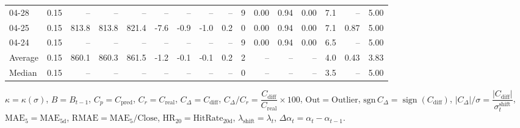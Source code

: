 \begin{threeparttable}
{\begin{tabular}{lrrrrrrrrrrrrrrr}
  04-28 &     0.15 &    -- &    -- &    -- &         -- &             -- &                       -- &                  -- &              9 &       0.00 &      0.94 &           0.00 &              7.1 &              -- &                   5.00 \\
  04-25 &     0.15 & 813.8 & 813.8 & 821.4 &       -7.6 &           -0.9 &                     -1.0 &                 0.2 &              0 &       0.00 &      0.94 &           0.00 &              7.1 &            0.87 &                   5.00 \\
  04-24 &     0.15 &    -- &    -- &    -- &         -- &             -- &                       -- &                  -- &              9 &       0.00 &      0.94 &           0.00 &              6.5 &              -- &                   5.00 \\
Average &     0.15 & 860.1 & 860.3 & 861.5 &       -1.2 &           -0.1 &                     -0.1 &                 0.2 &              2 &         -- &        -- &             -- &              4.0 &            0.43 &                   3.83 \\
 Median &     0.15 &    -- &    -- &    -- &         -- &             -- &                       -- &                  -- &              0 &         -- &        -- &             -- &              3.5 &              -- &                   5.00 \\
\bottomrule
\end{tabular}
}
\begin{tablenotes}\footnotesize
\item $\kappa=\kappa(\sigma)$, $B=B_{t-1}$, $C_p=C_{\text{pred}}$, $C_r=C_{\text{real}}$, $C_\Delta=C_{\text{diff}}$, $C_\Delta/C_r=\dfrac{C_{\text{diff}}}{C_{\text{real}}}\times100$, $\mathrm{Out}=\text{Outlier}$, $\mathrm{sgn}\,C_\Delta=\operatorname{sign}(C_{\text{diff}})$, $|C_\Delta|/\sigma=\dfrac{|C_{\text{diff}}|}{\sigma_t^{\text{shift}}}$, $\mathrm{MAE}_5=\mathrm{MAE}_{5\text{d}}$, $\mathrm{RMAE}= \mathrm{MAE}_5 / \text{Close}$, $\mathrm{HR}_{20}=\mathrm{HitRate}_{20\text{d}}$, 
$\lambda_{\text{shift}}=\lambda_t$, 
$\Delta\alpha_t=\alpha_t-\alpha_{t-1}$.
\end{tablenotes}
\end{threeparttable}
\endgroup

